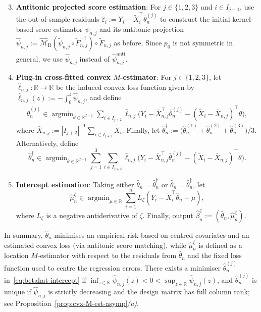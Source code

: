 \documentclass[a4paper]{article}
\newcommand{\R}{\mathbb{R}}
\DeclareMathOperator*{\argmin}{argmin}
\theoremstyle{definition}
\begin{document}
\begin{enumerate}[leftmargin=0.55cm,label=\arabic*$'$.]
\setcounter{enumi}{2}
\item \textbf{Antitonic projected score estimation}: For $j \in \{1,2,3\}$ and $i \in I_{j+1}$, use the out-of-sample residuals $\hat{\varepsilon}_i := Y_i - \tilde{X}_i^\top\bar{\theta}_n^{(j)}$ to construct the initial kernel-based score estimator $\tilde{\psi}_{n,j}$ and its antitonic projection $\hat{\psi}_{n,j} := \widehat{\mathcal{M}}_\mathrm{R}(\tilde{\psi}_{n,j} \circ \tilde{F}_{n,j}^{-1}) \circ \tilde{F}_{n,j}$ as before. Since $p_0$ is not symmetric in general, we use $\hat{\psi}_{n,j}$ instead of $\hat{\psi}_{n,j}^{\mathrm{anti}}$.
\item \textbf{Plug-in cross-fitted convex $M$-estimator}: For $j \in \{1,2,3\}$, let $\hat{\ell}_{n,j} \colon \R \to \R$ be the induced convex loss function given by $\hat{\ell}_{n,j}(z) := -\int_0^z \hat{\psi}_{n,j}$, and define
\begin{align}
\label{eq:betahat-intercept}
\hat{\theta}_n^{(j)} \in \argmin_{\theta \in \R^{d-1}} \sum_{i \in I_{j+2}} \hat{\ell}_{n,j}\bigl(Y_i - \bar{X}_{n,j}^\top\bar{\theta}_n^{(j)} - (\tilde{X}_i - \bar{X}_{n,j})^\top\theta\bigr),
\end{align}
where $\bar{X}_{n,j} := |I_{j+2}|^{-1}\sum_{i \in I_{j+2}}\tilde{X}_i$. Finally, let $\hat{\theta}_n^\dagger := \bigl(\hat{\theta}_n^{(1)} + \hat{\theta}_n^{(2)} + \hat{\theta}_n^{(3)}\bigr)/3$. Alternatively, define
\[
\hat{\theta}_n^\ddagger \in \argmin_{\theta \in \R^{d-1}} \sum_{j=1}^3 \sum_{i \in I_{j+2}} \hat{\ell}_{n,j}\bigl(Y_i - \bar{X}_{n,j}^\top\bar{\theta}_n^{(j)} - (\tilde{X}_i - \bar{X}_{n,j})^\top\theta\bigr).
\]
\item \textbf{Intercept estimation}: Taking either $\hat{\theta}_n = \hat{\theta}_n^\dagger$ or $\hat{\theta}_n = \hat{\theta}_n^\ddagger$, let
\begin{equation}
\label{eq:intercept-est}
\hat{\mu}_n^\zeta \in \argmin_{\mu \in \R} \sum_{i=1}^n L_\zeta(Y_i - \tilde{X}_i^\top\hat{\theta}_n - \mu),
\end{equation}
where $L_\zeta$ is a negative antiderivative of $\zeta$. Finally, output $\hat{\beta}_n^\zeta := (\hat{\theta}_n,\hat{\mu}_n^\zeta)$. 
\end{enumerate}

In summary, $\hat{\theta}_n$ minimises an empirical risk based on centred covariates and an estimated convex loss (via antitonic score matching), while $\hat{\mu}_n^\zeta$ is defined as a location $M$-estimator with respect to the residuals from $\hat{\theta}_n$ and the fixed loss function used to centre the regression errors. There exists a minimiser $\hat{\theta}_n^{(j)}$ in~\eqref{eq:betahat-intercept} if $\inf_{z \in \R}\hat{\psi}_{n,j}(z) < 0 < \sup_{z \in \R}\hat{\psi}_{n,j}(z)$, and $\hat{\theta}_n^{(j)}$ is unique if $\hat{\psi}_{n,j}$ is strictly decreasing and the design matrix has full column rank; see Proposition~\ref{prop:cvx-M-est-asymp}\textit{(a)}. 
\end{document}
